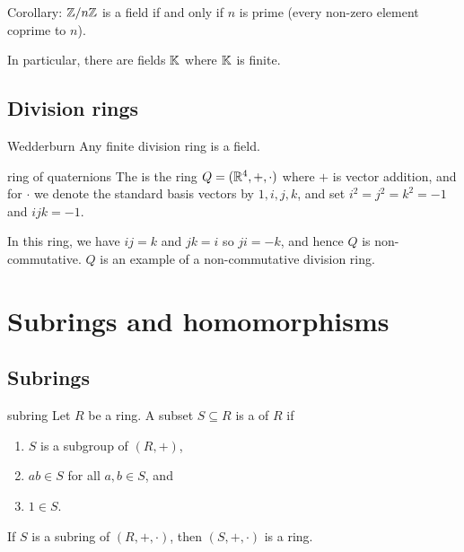 \documentclass[12pt,letterpaper]{report}
\begin{document}
Corollary: $\mathbb{Z}/{n}\mathbb{Z}$ is a field if and only if $n$ is prime (every non-zero element coprime to
$n$).

In particular, there are fields $\mathbb{K}$ where $\mathbb{K}$ is finite.

\pagebreak
\subsection{Division rings}

\begin{thm}{Wedderburn}{}
  Any finite division ring is a field.
\end{thm}

\begin{defn}{ring of quaternions}{}
  The  is the ring $Q = (\mathbb{R}^4, +, \cdot)$ where $+$ is vector
  addition, and for $\cdot$ we denote the standard basis vectors by $1, i, j, k$, and set
  $i^2 = j^2 = k^2 = -1$ and $ijk = -1$.
\end{defn}

In this ring, we have $ij = k$ and $jk = i$ so $ji = -k$, and hence $Q$ is non-commutative.
$Q$ is an example of a non-commutative division ring.

\section{Subrings and homomorphisms}

\subsection{Subrings}

\begin{defn}{subring}{}
  Let $R$ be a ring.
  A subset $S \subseteq R$ is a  of $R$ if
  \begin{enumerate}
    \item $S$ is a subgroup of $(R, +)$,
    \item $ab \in S$ for all $a, b \in S$, and
    \item $1 \in S$.
  \end{enumerate}
\end{defn}

\begin{lem}{}{}
  If $S$ is a subring of $(R, +, \cdot)$, then $(S, +, \cdot)$ is a ring.
\end{lem}
\end{document}
